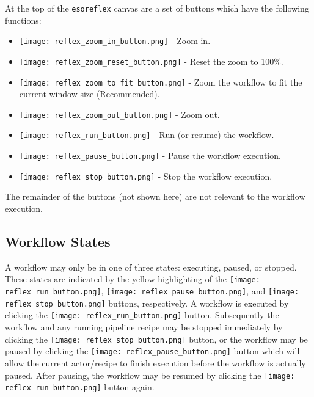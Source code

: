At the top of the {\tt esoreflex} canvas are a set of buttons which have the following functions:
\begin{itemize}
\item{\texttt{[image: reflex\_zoom\_in\_button.png]} - Zoom in.}
\item{\texttt{[image: reflex\_zoom\_reset\_button.png]} - Reset the zoom to 100\%.}
\item{\texttt{[image: reflex\_zoom\_to\_fit\_button.png]} - Zoom the workflow to fit the current window size (Recommended).}
\item{\texttt{[image: reflex\_zoom\_out\_button.png]} - Zoom out.}
\item{\texttt{[image: reflex\_run\_button.png]} - Run (or resume) the workflow.}
\item{\texttt{[image: reflex\_pause\_button.png]} - Pause the workflow execution.}
\item{\texttt{[image: reflex\_stop\_button.png]} - Stop the workflow execution.}
\end{itemize}
The remainder of the buttons (not shown here) are not relevant to the 
workflow execution.

\subsection{Workflow States}

A workflow may only be in one of three states: executing, paused, or stopped.
 These states are indicated by the yellow highlighting of the
\texttt{[image: reflex\_run\_button.png]},
\texttt{[image: reflex\_pause\_button.png]},
and \texttt{[image: reflex\_stop\_button.png]}
buttons, respectively. A workflow is executed by clicking the
\texttt{[image: reflex\_run\_button.png]} button. 
Subsequently the workflow and any running
pipeline recipe may be stopped immediately by clicking the
\texttt{[image: reflex\_stop\_button.png]}
button, or the workflow may be paused by clicking the 
\texttt{[image: reflex\_pause\_button.png]} button which
will allow the current actor/recipe to finish execution before the workflow is 
actually paused. 
After pausing, the workflow may be resumed by clicking the
\texttt{[image: reflex\_run\_button.png]} button again.

